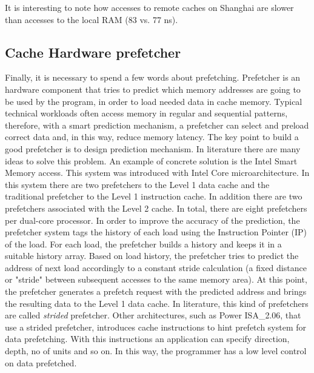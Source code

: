 It is interesting to note how  accesses to remote caches on Shanghai are slower than accesses to the local RAM (83 vs. 77 ns). 

\subsection{Cache Hardware prefetcher}

Finally, it is necessary to spend a few words about prefetching. Prefetcher is an hardware component that tries to predict which memory addresses are
going to be used by the program, in order to load needed data in cache memory.
Typical technical workloads often access memory in regular and sequential patterns, therefore, with a smart prediction mechanism, a prefetcher can select 
and preload correct data and, in this way, reduce memory latency. The key point to build a good prefetcher is to design prediction mechanism.
In literature there are many ideas to solve this problem. An example of concrete solution is the Intel Smart Memory access. This system was introduced
with Intel Core microarchitecture. In this system there are two prefetchers to the Level 1 data cache and the traditional prefetcher to the Level 1 
instruction cache. In addition there are two prefetchers associated with the Level 2 cache. In total, there are eight prefetchers per dual-core processor. 
In order to improve the accuracy of the prediction, the prefetcher system tags the history of each load using the Instruction Pointer (IP) of the load. 
For each load, the prefetcher builds a history and keeps it in a suitable history array. Based on load history, the prefetcher tries to predict the 
address of next load accordingly to a constant stride calculation (a fixed distance or "stride" between subsequent accesses to the same memory area). 
At this point, the prefetcher generates a prefetch request with the predicted address and brings the resulting data to the Level 1 data cache.
In literature, this kind of prefetchers are called \textit{strided} prefetcher.
Other architectures, such as Power ISA\_2.06, that use a strided prefetcher, introduces cache instructions to hint prefetch system for data prefetching.
With this instructions an application can specify direction, depth, no of units and so on. In this way, the programmer has a low level control on 
data prefetched.

